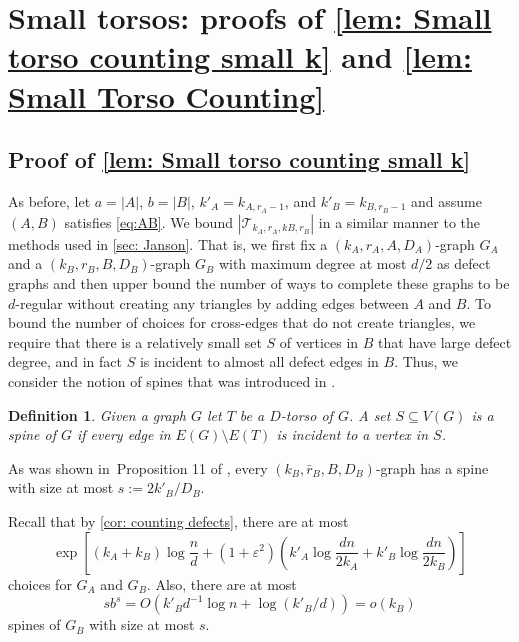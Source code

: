 \documentclass[11pt]{article}
\newcommand{\eps}{\varepsilon}
\theoremstyle{plain}
\newtheorem{definition}[thm]{Definition}
\begin{document}
\section{Small torsos: proofs of \cref{lem: Small torso counting small k} and \cref{lem: Small Torso Counting}}\label{sec: Small Torso}
\subsection{Proof of \cref{lem: Small torso counting small k}}\label{sec: small torso simple}
As before, let $a = |A|$, $b = |B|$, $k'_A = k_{A, r_A - 1}$, and $k'_B = k_{B, r_B - 1}$ and assume $(A,B)$ satisfies \eqref{eq:AB}. We bound $|\mathcal T_{k_A, r_A, kB, r_B}|$ in a similar manner to the methods used in \cref{sec: Janson}. That is, we first fix a $(k_A, r_A, A, D_A)$-graph $G_A$ and a $(k_B, r_B, B, D_B)$-graph $G_B$ with maximum degree at most $d/2$ as defect graphs and then upper bound the number of ways to complete these graphs to be $d$-regular without creating any triangles by adding edges between $A$ and $B$. To bound the number of choices for cross-edges that do not create triangles, we require that there is a relatively small set $S$ of vertices in $B$ that have large defect degree, and in fact $S$ is incident to almost all defect edges in $B$. Thus, we consider the notion of spines that was introduced in \cite{osthus2003densities}.

\begin{definition}\label{def: spine}
    Given a graph $G$ let $T$ be a $D$-torso of $G$. A set $S \subseteq V(G)$ is a spine of $G$ if every edge in $E(G) \setminus E(T)$ is incident to a vertex in $S$. 
\end{definition}
As was shown in~Proposition 11 of \cite{osthus2003densities}, every $(k_B, \bar r_B, B, D_B)$-graph has a spine with size at most $s := 2k'_B/D_B$. 

Recall that by \cref{cor: counting defects}, there are at most 
\begin{equation}\label{eq: GAGB}
    \exp\left[(k_A + k_B)\log\frac{n}{d} + (1 + \eps^2)\left(k'_A\log\frac{dn}{2k_A} +k'_B\log\frac{dn}{2k_B}\right)\right]
\end{equation}
choices for $G_A$ and $G_B$. Also, there are at most 
\begin{equation}\label{eq: bounding spines 1}
    sb^{s} = O(k'_Bd^{-1}\log n + \log(k'_B/d)) = o(k_B)
\end{equation}
spines of $G_B$ with size at most $s$.
\end{document}

